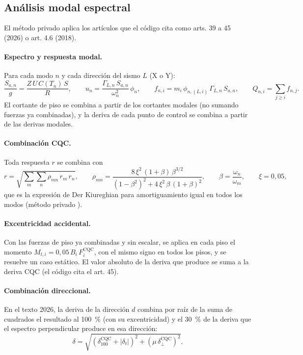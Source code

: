 \subsection{Análisis modal espectral}
\label{sec:sis-espectral}

El método privado  aplica los artículos que el código cita como arts. 39 a 45 (2026) o art. 4.6 (2018).

\paragraph{Espectro y respuesta modal.} Para cada modo $n$ y cada dirección del sismo $L$ (X o Y):
\begin{equation}
	\frac{S_{a,n}}{g} = \frac{Z\,U\,C(T_n)\,S}{R}, \qquad
	u_n = \frac{\Gamma_{L,n}\,S_{a,n}}{\omega_n^2}\,\phi_n, \qquad
	f_{n,i} = m_i\,\phi_{n,(L,i)}\,\Gamma_{L,n}\,S_{a,n}, \qquad
	Q_{n,i} = \sum_{j \ge i} f_{n,j} .
	\label{eq:sis-modal}
\end{equation}
El cortante de piso se combina a partir de los cortantes modales (no sumando fuerzas ya combinadas), y la deriva de cada
punto de control se combina a partir de las derivas modales.

\paragraph{Combinación CQC.} Toda respuesta $r$ se combina con
\begin{equation}
	r = \sqrt{\sum_{m}\sum_{n} \rho_{mn}\,r_m\,r_n}, \qquad
	\rho_{mn} = \frac{8\,\xi^2\,(1 + \beta)\,\beta^{3/2}}{(1 - \beta^2)^2 + 4\,\xi^2\,\beta\,(1 + \beta)^2},
	\qquad \beta = \frac{\omega_n}{\omega_m}, \qquad \xi = 0{,}05,
	\label{eq:sis-cqc}
\end{equation}
que es la expresión de Der Kiureghian para amortiguamiento igual en todos los modos (método privado ).

\paragraph{Excentricidad accidental.} Con las fuerzas de piso ya combinadas y sin escalar, se aplica en cada piso el
momento $M_{t,i} = 0{,}05\,B_i\,F_i^{\text{CQC}}$, con el mismo signo en todos los pisos, y se resuelve un caso estático.
El valor absoluto de la deriva que produce se suma a la deriva CQC (el código cita el art. 45).

\paragraph{Combinación direccional.} En el texto 2026, la deriva de la dirección $d$ combina por raíz de la suma de
cuadrados el resultado al 100~\% (con su excentricidad) y el 30~\% de la deriva que el espectro perpendicular produce en
esa dirección:
\begin{equation}
	\delta = \sqrt{\left(\delta^{\text{CQC}}_{100} + \left|\delta_{t}\right|\right)^2 + \left(\mu\,\delta^{\text{CQC}}_{\perp}\right)^2} .
	\label{eq:sis-combinacion-espectral}
\end{equation}

